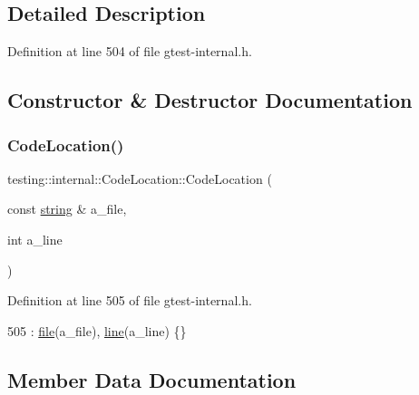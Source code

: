 \subsection{Detailed Description}


Definition at line 504 of file gtest-\/internal.\+h.



\subsection{Constructor \& Destructor Documentation}
\mbox{\label{structtesting_1_1internal_1_1CodeLocation_ade3ecb2a54905619cd40a6856b48cd5a}} 
\subsubsection{\texorpdfstring{Code\+Location()}{CodeLocation()}}
{\footnotesize\ttfamily testing\+::internal\+::\+Code\+Location\+::\+Code\+Location (\begin{DoxyParamCaption}\item[{const \hyperlink{namespacetesting_1_1internal_a8e8ff5b11e64078831112677156cb111}{string} \&}]{a\+\_\+file,  }\item[{int}]{a\+\_\+line }\end{DoxyParamCaption})\hspace{0.3cm}{\ttfamily [inline]}}



Definition at line 505 of file gtest-\/internal.\+h.


\begin{DoxyCode}
505 : \hyperlink{structtesting_1_1internal_1_1CodeLocation_ab8a24d5e63295e411d37578dbb9427c0}{file}(a\_file), \hyperlink{structtesting_1_1internal_1_1CodeLocation_a01c977c7e8834a05a6d6c40b0c416045}{line}(a\_line) \{\}
\end{DoxyCode}


\subsection{Member Data Documentation}
\mbox{\label{structtesting_1_1internal_1_1CodeLocation_ab8a24d5e63295e411d37578dbb9427c0}} 
